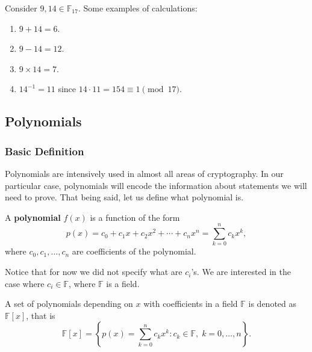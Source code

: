 \documentclass[../lecture-notes.tex]{subfiles}
\begin{document}
\begin{example}
    Consider $9, 14 \in \mathbb{F}_{17}$. Some examples of calculations:
    \begin{enumerate}
        \item $9+14 = 6$.
        \item $9-14 = 12$.
        \item $9 \times 14 = 7$.
        \item $14^{-1} = 11$ since $14 \cdot 11 = 154 \equiv 1 \pmod{17}$.
    \end{enumerate}
\end{example}

\subsection{Polynomials}\label{section:polynomials}

\subsubsection{Basic Definition}

Polynomials are intensively used in almost all areas of cryptography. In our particular case, polynomials will encode the information about
statements we will need to prove. That being said, let us define what polynomial is.

\begin{definition}
    A \textbf{polynomial} $f(x)$ is a function of the form
    \begin{equation*}
        p(x) = c_0 + c_1 x + c_2 x^2 + \cdots + c_n x^n = \sum_{k=0}^{n} c_k x^k,
    \end{equation*}
    where $c_0, c_1, \dots, c_n$ are coefficients of the polynomial.
\end{definition}

Notice that for now we did not specify what are $c_i$'s. We are interested in the case where $c_i \in \mathbb{F}$, where $\mathbb{F}$ is a field. 

\begin{definition}
    A set of polynomials depending on $x$ with coefficients in a field $\mathbb{F}$ is denoted as $\mathbb{F}[x]$, that is
    \begin{equation*}
        \mathbb{F}[x] = \left\{p(x) = \sum_{k=0}^{n} c_k x^k: c_k \in \mathbb{F}, \; k = 0,\dots,n\right\}.
    \end{equation*}
\end{definition}
\end{document}
